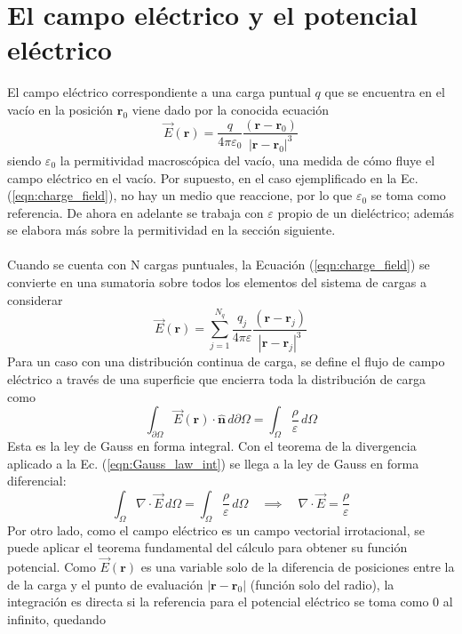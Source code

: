 \documentclass[12pt, oneside, numbers, spanish]{ezthesis}
\numberwithin{equation}{section}
\begin{document}
\section{El campo eléctrico y el potencial eléctrico}\label{Sec:E_field_Pot_elec}
El campo eléctrico correspondiente a una carga puntual $q$ que se encuentra en el vacío en la posición $\mathbf{r}_0$ viene dado por la conocida ecuación
\begin{equation}\label{eqn:charge_field}
\vec{E}(\mathbf{r}) = \frac{q}{4\pi\varepsilon_0}\frac{(\mathbf{r} - \mathbf{r}_0)}{|\mathbf{r}-\mathbf{r}_0|^3}
\end{equation}
siendo $\varepsilon_0$ la permitividad macroscópica del vacío, una medida de cómo fluye el campo eléctrico en el vacío. Por supuesto, en el caso ejemplificado en la Ec. (\ref{eqn:charge_field}), no hay un medio que reaccione, por lo que $\varepsilon_0$ se toma como referencia. De ahora en adelante se trabaja con $\varepsilon$ propio de un dieléctrico; además se elabora más sobre la permitividad en la sección siguiente.\\\\
Cuando se cuenta con N cargas puntuales, la Ecuación (\ref{eqn:charge_field}) se convierte en una sumatoria sobre todos los elementos del sistema de cargas a considerar
\begin{equation}\label{eqn:electric_field_sum}
\vec{E}(\mathbf{r}) = \sum_{j=1}^{N_q}\frac{q_j}{4\pi\varepsilon}\frac{(\mathbf{r} - \mathbf{r}_j)}{|\mathbf{r}-\mathbf{r}_j|^3}
\end{equation}
Para un caso con una distribución continua de carga, se define el flujo de campo eléctrico a través de una superficie que encierra toda la distribución de carga como
\begin{equation}
\int_{\partial\Omega}\vec{E}(\mathbf{r})\cdot \hat{\mathbf{n}}\, d\partial\Omega = \int_{\Omega} \frac{\rho}{\varepsilon}\, d\Omega \label{eqn:Gauss_law_int}
\end{equation}
Esta es la ley de Gauss en forma integral. Con el teorema de la divergencia aplicado a la Ec. (\ref{eqn:Gauss_law_int}) se llega a la ley de Gauss en forma diferencial:
\begin{equation}
\int_{\Omega} \nabla\cdot\vec{E} \, d\Omega = \int_\Omega \frac{\rho}{\varepsilon}\, d\Omega \quad\implies\quad \nabla\cdot\vec{E} = \frac{\rho}{\varepsilon} \label{eqn:Gauss_law_diff}
\end{equation}
Por otro lado, como el campo eléctrico es un campo vectorial irrotacional, se puede aplicar el teorema fundamental del cálculo para obtener su función potencial. Como $\vec{E}(\mathbf{r})$ es una variable solo de la diferencia de posiciones entre la de la carga y el punto de evaluación $|\mathbf{r} - \mathbf{r}_0|$ (función solo del radio), la integración es directa si la referencia para el potencial eléctrico se toma como $0$ al infinito, quedando
\end{document}
